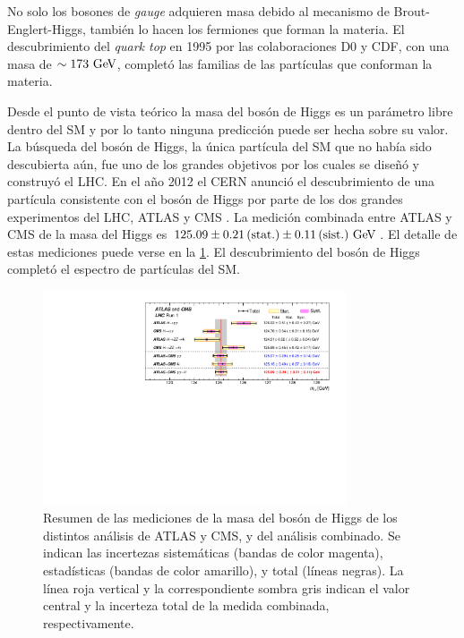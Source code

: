 No solo los bosones de \emph{gauge} adquieren masa debido al mecanismo de Brout-Englert-Higgs,
también lo hacen los fermiones que forman la materia. El descubrimiento del
\emph{quark top} en 1995 por las colaboraciones D0 y CDF, con una masa de $\sim 173
\GeV$, completó las familias de las partículas que conforman la materia.

Desde el punto de vista teórico la masa del bosón de Higgs es un parámetro libre
dentro del SM y por lo tanto ninguna predicción puede ser hecha sobre su valor. La búsqueda
del bosón de Higgs, la única partícula del SM que no había sido descubierta
aún, fue uno de los grandes objetivos por los cuales se dise\~nó y construyó el
LHC. En el a\~no 2012 el CERN anunció el
descubrimiento de una partícula consistente con el bosón de Higgs por parte de
los dos grandes experimentos del LHC, ATLAS y CMS
\cite{Aad:2012tfa,Chatrchyan:2012ufa}. La medición combinada entre ATLAS y CMS
de la masa del Higgs es $125.09 \pm 0.21\, \text{(stat.)} \pm 0.11\, \text{(sist.)}
\gev$\cite{HiggsMass_ATLAS_CMS}. %
El detalle de estas mediciones  puede verse en la \cref{fig:higgs_cms_atlas}.
El descubrimiento del bosón de Higgs completó el espectro de partículas del SM.

\begin{figure}[!htbp]
  \centering
  \includegraphics[width=0.8\textwidth]{figures/higgs_atlas_cms_mass}
  \caption{Resumen de las mediciones de la masa del bosón de Higgs de los
    distintos análisis de ATLAS y CMS, y del análisis combinado. Se indican las
    incertezas sistemáticas (bandas de color magenta), estadísticas (bandas de
    color amarillo), y total (líneas negras). La línea roja vertical y la
    correspondiente sombra gris indican el valor central y la incerteza total de
    la medida combinada, respectivamente\cite{HiggsMass_ATLAS_CMS}.}
  \label{fig:higgs_cms_atlas}
\end{figure}



